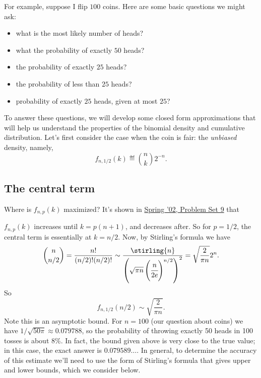 \documentclass[11pt,twoside]{article}
\begin{document}
\fi

For example, suppose I flip $100$ coins.  Here are some basic questions we
might ask:
\begin{itemize}
\item what is the most likely number of heads?
\item what the probability of exactly $50$ heads?
\item the probability of exactly $25$ heads?
\item the probability of less than $25$ heads?
\item probability of exactly $25$ heads, given at most $25$?
\end{itemize}


To answer these questions, we will develop some closed form approximations
that will help us understand the properties of the binomial density and
cumulative distribution.  Let's first consider the case when the coin is
fair: the \emph{unbiased} density, namely,
\[
f_{n,1/2}(k) \eqdef \binom{n}{k}2^{-n}.
\]

\subsection{The central term}

Where is $f_{n,p}(k)$ maximized?  It's shown in
\href{http://theory.lcs.mit.edu/classes/6.042/spring02/handouts/problemsets/ps9.pdf}
{Spring '02, Problem Set 9} that

$f_{n,p}(k)$ increases until $k=p(n+1)$, and decreases after.
So for $p=1/2$, the central term is essentially at $k=n/2$.  Now, by
Stirling's formula we have
\[
\binom{n}{n/2} = \frac{n!}{(n/2)!(n/2)!} \sim 
\frac{\stirling{n}}{\paren{\sqrt{\pi n}\paren{\cfrac{n}{2e}}^{n/2}}^2} =
\sqrt{\frac{2}{\pi n}}2^n.
\]
So 
\begin{equation}\label{unbiased central term}
f_{n,1/2}(n/2) \sim \sqrt{\frac{2}{\pi n}}.
\end{equation}
Note this is an asymptotic bound.  For $n=100$ (our question about coins)
we have $1/\sqrt{50 \pi} \approx 0.079788$, so the probability of
throwing exactly 50 heads in 100 tosses is about 8\%.  In fact, the bound
given above is very close to the true value; in this case, the exact
answer is $0.079589\ldots$.  In general, to determine the accuracy of this
estimate we'll need to use the form of Stirling's formula that gives upper
and lower bounds, which we consider below.
\end{document}

